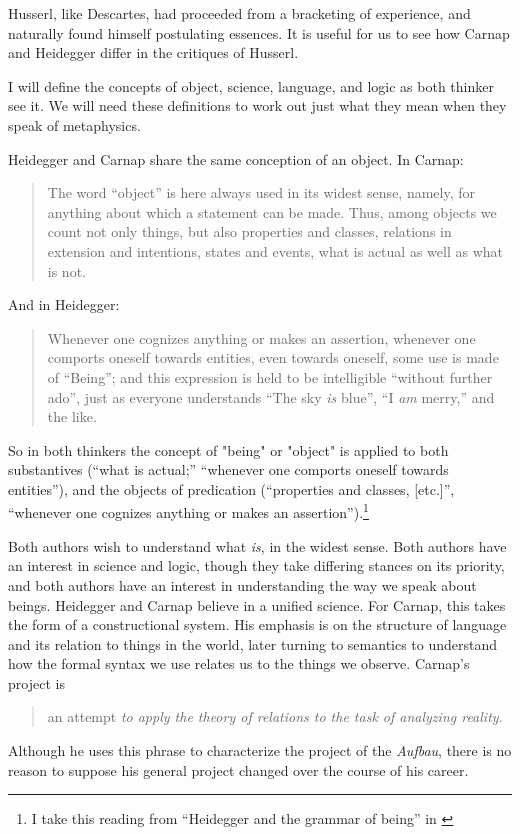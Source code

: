 \documentclass[leqno, 12pt]{turabian-researchpaper}
\begin{document}
	Husserl, like Descartes, had proceeded from a bracketing of experience, and naturally
	found himself postulating essences. It is useful for us to see how Carnap and
	Heidegger differ in the critiques of Husserl.

	I will define the concepts of object, science, language, and logic as both thinker
	see it. We will need these definitions to work out just what they mean when
	they speak of metaphysics.

	Heidegger and Carnap share the same conception of an object. In Carnap:
	\blockquote[{\cite[5]{carnap2003}}]{The word \enquote{object} is here always used in its widest sense, namely, for anything about which a statement can be made. Thus, among objects we count not only things, but also properties and classes, relations in extension and intentions, states and events, what is actual as well as what is not.}
	And in Heidegger: \blockquote[{\cite[5]{heidegger2008b}}]{Whenever one cognizes anything or makes an assertion, whenever one comports oneself towards entities, even towards oneself, some use is made of \enquote{Being}; and this expression is held to be intelligible \enquote{without further ado}, just as everyone understands \enquote{The sky \emph{is} blue}, \enquote{I \emph{am} merry,} and the like.}
	So in both thinkers the concept of "being" or "object" is applied to both substantives
	(\enquote{what is actual;} \enquote{whenever one comports oneself towards entities}),
	and the objects of predication (\enquote{properties and classes, [etc.]}, \enquote{whenever one cognizes anything or makes an assertion}).\footnote{I
	take this reading from \enquote{Heidegger and the grammar of being} in \cite[chap.
	15]{priest2002}}

	Both authors wish to understand what \emph{is}, in the widest sense. Both authors
	have an interest in science and logic, though they take differing stances on
	its priority, and both authors have an interest in understanding the way we speak
	about beings. Heidegger and Carnap believe in a unified science. For Carnap,
	this takes the form of a constructional system. His emphasis is on the structure
	of language and its relation to things in the world, later turning to
	semantics to understand how the formal syntax we use relates us to the things
	we observe. Carnap's project is \blockquote[{\cite[7]{carnap2003}}]{an attempt \emph{to apply the theory of relations to the task of analyzing reality.}}
	Although he uses this phrase to characterize the project of the \textit{Aufbau},
	there is no reason to suppose his general project changed over the course of his
	career.
\end{document}
